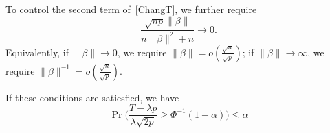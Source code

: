 \documentclass[review]{elsarticle}
\theoremstyle{plain}
\theoremstyle{definition}
\theoremstyle{remark}
\begin{document}
To control the second term of~\eqref{ChangT}, we further require
\begin{equation*}
\frac{\sqrt{np}\|\beta\|}{n\|\beta\|^2+n}\to 0.
\end{equation*}
Equivalently, if $\|\beta\|\to 0$, we require $\|\beta\|=o(\frac{\sqrt{n}}{\sqrt{p}})$; if $\|\beta\|\to \infty$, we require $\|\beta\|^{-1}=o(\frac{\sqrt{n}}{\sqrt{p}})$.

If these conditions are satiesfied, we have 
\begin{equation*}
    \Pr\Big(\frac{T-\lambda p}{\lambda\sqrt{2p}}\geq \Phi^{-1}(1-\alpha)\Big)\leq
    \alpha
\end{equation*}




%
\end{document}
